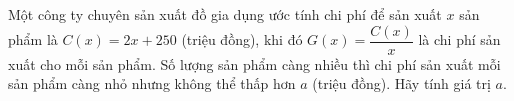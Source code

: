 \begin{bt}%
	Một công ty chuyên sản xuất đồ gia dụng ước tính chi phí để sản xuất $x$   sản phẩm là $C(x)=2x+250$ (triệu đồng), khi đó $G(x)=\dfrac{C(x)}{x}$  là chi phí sản xuất cho mỗi sản phẩm. Số lượng sản phẩm càng nhiều thì chi phí sản xuất mỗi sản phẩm càng nhỏ nhưng không thể thấp hơn $a$ (triệu đồng). Hãy tính giá trị $a$.
	
\end{bt}

